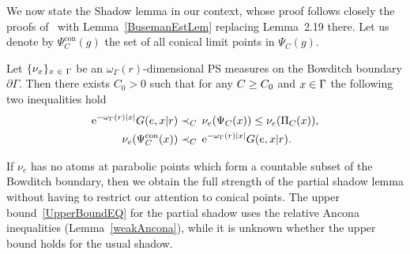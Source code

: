 \documentclass[AHL,Unicode,longabstracts]{cedram}
\newcommand{\pG}{\partial{\Gamma}}
\newcommand{\rme}{\mathrm{e}}
\DeclareMathOperator{\con}{con}
\let\oldin\in
\renewcommand{\in}{\mathchoice{\oldin}{\oldin}{\,\oldin\,}{\,\oldin\,}}
\let\oldge\ge
\renewcommand{\ge}{\mathchoice{\oldge}{\oldge}{\,\oldge\,}{\,\oldge\,}}
\let\oldle\le
\renewcommand{\le}{\mathchoice{\oldle}{\oldle}{\,\oldle\,}{\,\oldle\,}}
\begin{document}
We now state the Shadow lemma in our context, whose proof follows closely the proofs of~\cite[Lemmas~4.1 \& 4.2]{YangPS} with Lemma~\ref{BusemanEstLem} replacing Lemma~2.19 there. Let us denote by $\Psi^{\con}_C(g)$ the set of all conical limit points in $\Psi_C(g)$.

\begin{lemm}\label{ShadowLem}
Let $\{\nu_x\}_{x \in \Gamma}$ be an $\omega_\Gamma(r)$-dimensional PS measures on the Bowditch boundary $\pG$. Then there exists $C_0> 0$ such that for any $C\ge C_0$ and $x\in \Gamma$ the following two inequalities hold
\begin{align}
\rme^{-\omega_\Gamma(r) |x|}G(e,x|r) &\prec_C \, \nu_e(\Psi_{C}(x))\le \nu_e(\Pi_{C}(x)),\label{LowBoundEQ}\\
\nu_e(\Psi^{\con}_{C}(x)) &\prec_C \, \rme^{-\omega_\Gamma(r) |x|} G(e,x|r).\label{UpperBoundEQ}
\end{align}
\end{lemm}

\begin{rema}
If $\nu_e$ has no atoms at parabolic points which form a countable subset of the Bowditch boundary, then we obtain the full strength of the partial shadow lemma without having to restrict our attention to conical points. The upper bound~\eqref{UpperBoundEQ} for the partial shadow uses the relative Ancona inequalities (Lemma~\ref{weakAncona}), while it is unknown whether the upper bound holds for the usual shadow.
\end{rema}
\end{document}
